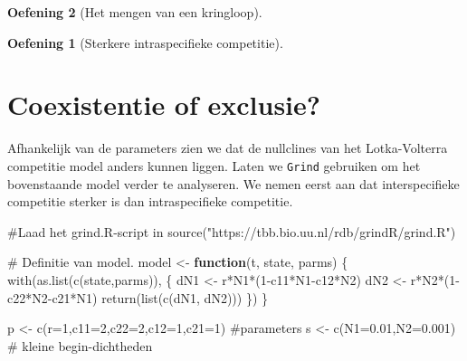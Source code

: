 \documentclass[
  a4paper,
]{scrbook}
\newenvironment{Shaded}{\begin{snugshade}}{\end{snugshade}}
\newcommand{\AttributeTok}[1]{\textcolor[rgb]{0.40,0.45,0.13}{#1}}
\newcommand{\CommentTok}[1]{\textcolor[rgb]{0.37,0.37,0.37}{#1}}
\newcommand{\ControlFlowTok}[1]{\textcolor[rgb]{0.00,0.23,0.31}{\textbf{#1}}}
\newcommand{\DecValTok}[1]{\textcolor[rgb]{0.68,0.00,0.00}{#1}}
\newcommand{\FloatTok}[1]{\textcolor[rgb]{0.68,0.00,0.00}{#1}}
\newcommand{\FunctionTok}[1]{\textcolor[rgb]{0.28,0.35,0.67}{#1}}
\newcommand{\NormalTok}[1]{\textcolor[rgb]{0.00,0.23,0.31}{#1}}
\newcommand{\OtherTok}[1]{\textcolor[rgb]{0.00,0.23,0.31}{#1}}
\newcommand{\SpecialCharTok}[1]{\textcolor[rgb]{0.37,0.37,0.37}{#1}}
\newcommand{\StringTok}[1]{\textcolor[rgb]{0.13,0.47,0.30}{#1}}
\theoremstyle{definition}
\newtheorem{exercise}{Oefening}[chapter]
\theoremstyle{remark}
\begin{document}
\begin{exercise}[Het mengen van een
kringloop]
\begin{exercise}[Sterkere intraspecifieke
competitie]
\end{exercise}

\section{Coexistentie of exclusie?}\label{coexistentie-of-exclusie}

Afhankelijk van de parameters zien we dat de nullclines van het
Lotka-Volterra competitie model anders kunnen liggen. Laten we
\texttt{Grind} gebruiken om het bovenstaande model verder te analyseren.
We nemen eerst aan dat interspecifieke competitie sterker is dan
intraspecifieke competitie.

\begin{Shaded}
\begin{Highlighting}[]
\CommentTok{\#Laad het grind.R{-}script in}
\FunctionTok{source}\NormalTok{(}\StringTok{"https://tbb.bio.uu.nl/rdb/grindR/grind.R"}\NormalTok{)}

\CommentTok{\# Definitie van model. }
\NormalTok{model }\OtherTok{\textless{}{-}} \ControlFlowTok{function}\NormalTok{(t, state, parms) \{}
  \FunctionTok{with}\NormalTok{(}\FunctionTok{as.list}\NormalTok{(}\FunctionTok{c}\NormalTok{(state,parms)), \{}
\NormalTok{    dN1 }\OtherTok{\textless{}{-}}\NormalTok{ r}\SpecialCharTok{*}\NormalTok{N1}\SpecialCharTok{*}\NormalTok{(}\DecValTok{1}\SpecialCharTok{{-}}\NormalTok{c11}\SpecialCharTok{*}\NormalTok{N1}\SpecialCharTok{{-}}\NormalTok{c12}\SpecialCharTok{*}\NormalTok{N2)}
\NormalTok{    dN2 }\OtherTok{\textless{}{-}}\NormalTok{ r}\SpecialCharTok{*}\NormalTok{N2}\SpecialCharTok{*}\NormalTok{(}\DecValTok{1}\SpecialCharTok{{-}}\NormalTok{c22}\SpecialCharTok{*}\NormalTok{N2}\SpecialCharTok{{-}}\NormalTok{c21}\SpecialCharTok{*}\NormalTok{N1)}
    \FunctionTok{return}\NormalTok{(}\FunctionTok{list}\NormalTok{(}\FunctionTok{c}\NormalTok{(dN1, dN2)))  }
\NormalTok{  \}) }
\NormalTok{\}  }


\NormalTok{p }\OtherTok{\textless{}{-}} \FunctionTok{c}\NormalTok{(}\AttributeTok{r=}\DecValTok{1}\NormalTok{,}\AttributeTok{c11=}\DecValTok{2}\NormalTok{,}\AttributeTok{c22=}\DecValTok{2}\NormalTok{,}\AttributeTok{c12=}\DecValTok{1}\NormalTok{,}\AttributeTok{c21=}\DecValTok{1}\NormalTok{)  }\CommentTok{\#parameters}
\NormalTok{s }\OtherTok{\textless{}{-}} \FunctionTok{c}\NormalTok{(}\AttributeTok{N1=}\FloatTok{0.01}\NormalTok{,}\AttributeTok{N2=}\FloatTok{0.001}\NormalTok{) }\CommentTok{\# kleine begin{-}dichtheden}


\end{Highlighting}
\end{Shaded}
\end{exercise}
\end{document}
